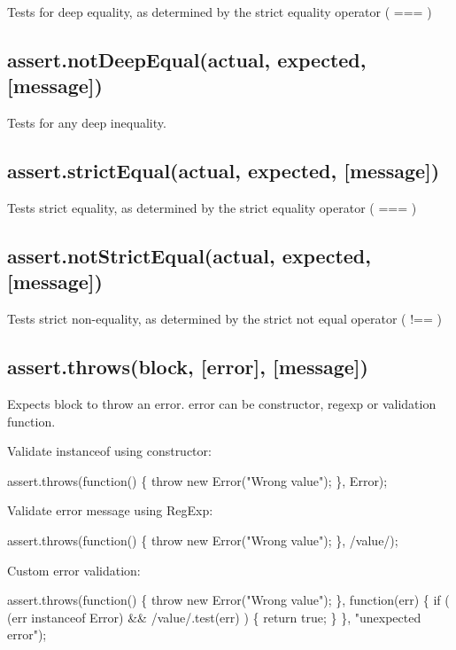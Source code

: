 Tests for deep equality, as determined by the strict equality operator ( === )

\subsection*{assert.\+not\+Deep\+Equal(actual, expected, \mbox{[}message\mbox{]})}

Tests for any deep inequality.

\subsection*{assert.\+strict\+Equal(actual, expected, \mbox{[}message\mbox{]})}

Tests strict equality, as determined by the strict equality operator ( === )

\subsection*{assert.\+not\+Strict\+Equal(actual, expected, \mbox{[}message\mbox{]})}

Tests strict non-\/equality, as determined by the strict not equal operator ( !== )

\subsection*{assert.\+throws(block, \mbox{[}error\mbox{]}, \mbox{[}message\mbox{]})}

Expects block to throw an error. error can be constructor, regexp or validation function.

Validate instanceof using constructor\+:


\begin{DoxyCode}
assert.throws(function() \{ throw new Error("Wrong value"); \}, Error);
\end{DoxyCode}


Validate error message using Reg\+Exp\+:


\begin{DoxyCode}
assert.throws(function() \{ throw new Error("Wrong value"); \}, /value/);
\end{DoxyCode}


Custom error validation\+:


\begin{DoxyCode}
assert.throws(function() \{
    throw new Error("Wrong value");
\}, function(err) \{
    if ( (err instanceof Error) && /value/.test(err) ) \{
        return true;
    \}
\}, "unexpected error");
\end{DoxyCode}


